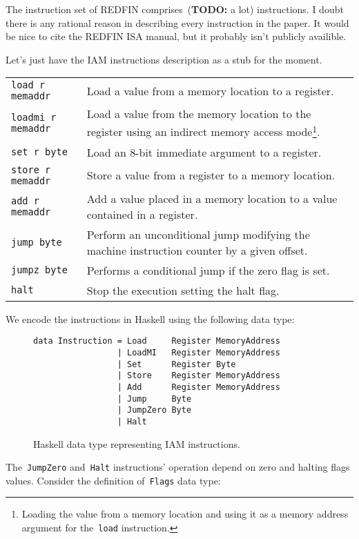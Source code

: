 The instruction set of REDFIN comprises~(\textbf{TODO:} a lot) instructions.
I doubt there is any rational reason in describing every instruction in the paper.
It would be nice to cite the REDFIN ISA manual, but it probably isn't publicly
availible.

Let's just have the IAM instructions description as a stub for the moment.

\begin{longtable}{l|p{9cm}}
\texttt{load r memaddr}     & Load a value from a memory location to a register.\\
\texttt{loadmi r memaddr}   & Load a value from the memory location to the register using
an indirect memory access mode\footnote{Loading the value from a memory location and using it as
a memory address argument for the~\texttt{load} instruction.}.\\
\texttt{set      r byte   } & Load an 8-bit immediate argument to a register.\\
\texttt{store    r memaddr} & Store a value from a register to a memory location.\\
\texttt{add      r memaddr} & Add a value placed in a memory location to a value contained in a register.\\
\texttt{jump     byte     } & Perform an unconditional jump modifying the machine
instruction counter by a given offset.\\
\texttt{jumpz    byte     } & Performs a conditional jump if the zero flag is set.\\
\texttt{halt              } & Stop the execution setting the halt flag.
\end{longtable}

We encode the instructions in Haskell using the following data type:

\begin{figure}[H]
\begin{verbatim}
data Instruction = Load     Register MemoryAddress
                 | LoadMI   Register MemoryAddress
                 | Set      Register Byte
                 | Store    Register MemoryAddress
                 | Add      Register MemoryAddress
                 | Jump     Byte
                 | JumpZero Byte
                 | Halt
\end{verbatim}
\caption{Haskell data type representing IAM instructions.}
\label{Instruction}
\end{figure}

The~\texttt{JumpZero} and~\texttt{Halt} instructions'
operation depend on zero and halting flags values. Consider the definition
of~\texttt{Flags} data type:

